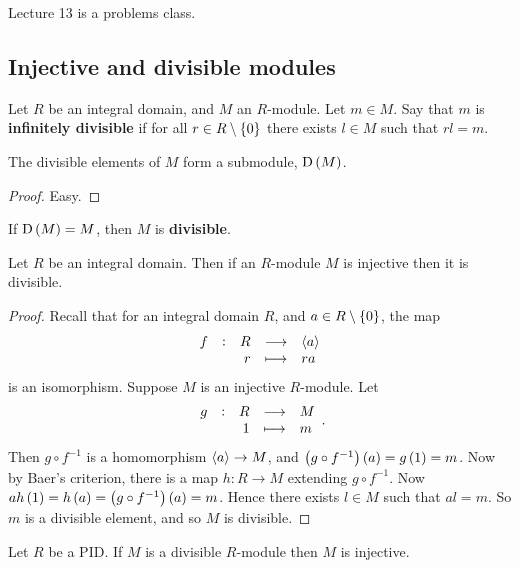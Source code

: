 
Lecture 13 is a problems class.

\pagebreak

\subsection{Injective and divisible modules}


\begin{definition}
Let $ R $ be an integral domain, and $ M $ an $ R $-module. Let $ m \in M $. Say that $ m $ is \textbf{infinitely divisible} if for all $ r \in R \setminus \cbr{0} $ there exists $ l \in M $ such that $ rl = m $.
\end{definition}

\begin{proposition}
The divisible elements of $ M $ form a submodule, $ \D\br{M} $.
\end{proposition}

\begin{proof}
Easy.
\end{proof}

\begin{definition}
If $ \D\br{M} = M $, then $ M $ is \textbf{divisible}.
\end{definition}

\begin{proposition}
Let $ R $ be an integral domain. Then if an $ R $-module $ M $ is injective then it is divisible.
\end{proposition}

\begin{proof}
Recall that for an integral domain $ R $, and $ a \in R \setminus \cbr{0} $, the map
$$ \function[f]{R}{\abr{a}}{r}{ra} $$
is an isomorphism. Suppose $ M $ is an injective $ R $-module. Let
$$ \function[g]{R}{M}{1}{m}. $$
Then $ g \circ f^{-1} $ is a homomorphism $ \left\langle a \right\rangle \to M $, and $ \br{g \circ f^{-1}}\br{a} = g\br{1} = m $. Now by Baer's criterion, there is a map $ h : R \to M $ extending $ g \circ f^{-1} $. Now $ ah\br{1} = h\br{a} = \br{g \circ f^{-1}}\br{a} = m $. Hence there exists $ l \in M $ such that $ al = m $. So $ m $ is a divisible element, and so $ M $ is divisible.
\end{proof}

\begin{proposition}
Let $ R $ be a PID. If $ M $ is a divisible $ R $-module then $ M $ is injective.
\end{proposition}


